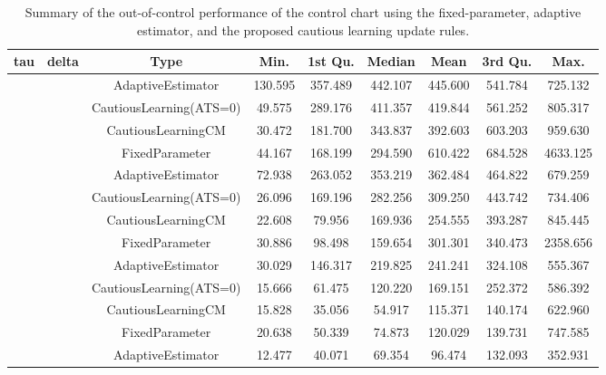 \begin{table}[!h]

\caption{Summary of the out-of-control performance of the control chart using the fixed-parameter, adaptive estimator, and the proposed cautious learning update rules.}
\centering
\begin{tabular}[t]{ccccccccc}
\toprule
tau & delta & Type & Min. & 1st Qu. & Median & Mean & 3rd Qu. & Max.\\
\midrule
 &  & AdaptiveEstimator & 130.595 & 357.489 & 442.107 & 445.600 & 541.784 & 725.132\\

 &  & CautiousLearning(ATS=0) & 49.575 & 289.176 & 411.357 & 419.844 & 561.252 & 805.317\\

 &  & CautiousLearningCM & 30.472 & 181.700 & 343.837 & 392.603 & 603.203 & 959.630\\

 & \multirow[t]{-4}{*}{\centering\arraybackslash 0.25} & FixedParameter & 44.167 & 168.199 & 294.590 & 610.422 & 684.528 & 4633.125\\
\cmidrule{2-9}
 &  & AdaptiveEstimator & 72.938 & 263.052 & 353.219 & 362.484 & 464.822 & 679.259\\

 &  & CautiousLearning(ATS=0) & 26.096 & 169.196 & 282.256 & 309.250 & 443.742 & 734.406\\

 &  & CautiousLearningCM & 22.608 & 79.956 & 169.936 & 254.555 & 393.287 & 845.445\\

 & \multirow[t]{-4}{*}{\centering\arraybackslash 0.35} & FixedParameter & 30.886 & 98.498 & 159.654 & 301.301 & 340.473 & 2358.656\\
\cmidrule{2-9}
 &  & AdaptiveEstimator & 30.029 & 146.317 & 219.825 & 241.241 & 324.108 & 555.367\\

 &  & CautiousLearning(ATS=0) & 15.666 & 61.475 & 120.220 & 169.151 & 252.372 & 586.392\\

 &  & CautiousLearningCM & 15.828 & 35.056 & 54.917 & 115.371 & 140.174 & 622.960\\

 & \multirow[t]{-4}{*}{\centering\arraybackslash 0.50} & FixedParameter & 20.638 & 50.339 & 74.873 & 120.029 & 139.731 & 747.585\\
\cmidrule{2-9}
 &  & AdaptiveEstimator & 12.477 & 40.071 & 69.354 & 96.474 & 132.093 & 352.931\\


\end{tabular}
\end{table}
